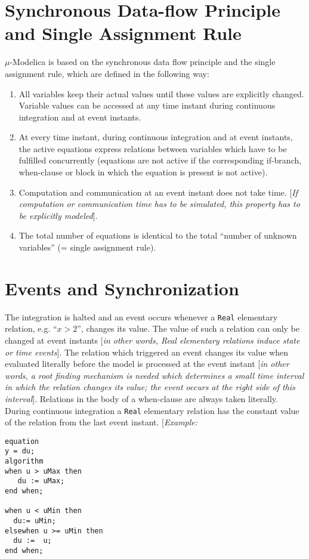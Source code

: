 \documentclass[11pt,a4paper,notitlepage]{report}
\begin{document}
\section{Synchronous Data-flow Principle and Single Assignment Rule}

$\mu$-Modelica is based on the synchronous data flow principle and the single assignment rule, which are defined in the following way:
\begin{enumerate}
\item All variables keep their actual values until these values are explicitly changed. Variable values can be accessed at any time instant during continuous integration and at event instants.
\item At every time instant, during continuous integration and at event instants, the active equations express relations between variables which have to be fulfilled concurrently (equations are not active if the corresponding if-branch, when-clause or block in which the equation is present is not active). 
\item Computation and communication at an event instant does not take time. [\emph{If computation or communication time has to be simulated, this property has to be explicitly modeled}]. 
\item The total number of equations is identical to the total “number of unknown variables” (= single assignment rule). 
\end{enumerate}

\section{Events and Synchronization}\label{equations:events}

The integration is halted and an event occurs whenever a \verb"Real" elementary relation, e.g. “$x > 2$”, changes its value. The value of such a relation can only be changed at event instants [\emph{in other words, Real elementary relations induce state or time events}]. The relation which triggered an event changes its value when evaluated literally before the model is processed at the event instant [\emph{in other words, a root finding mechanism is needed which determines a small time interval in which the relation changes its value; the event occurs at the right side of this interval}]. Relations in the body of a when-clause are always taken literally. During continuous integration a \verb"Real" elementary relation has the constant value of the relation from the last event instant.
[\emph{Example:}
\begin{verbatim}
equation
y = du;
algorithm
when u > uMax then
   du := uMax;
end when;

when u < uMin then
  du:= uMin;
elsewhen u >= uMin then 
  du :=  u;
end when;
\end{verbatim}
\end{document}
